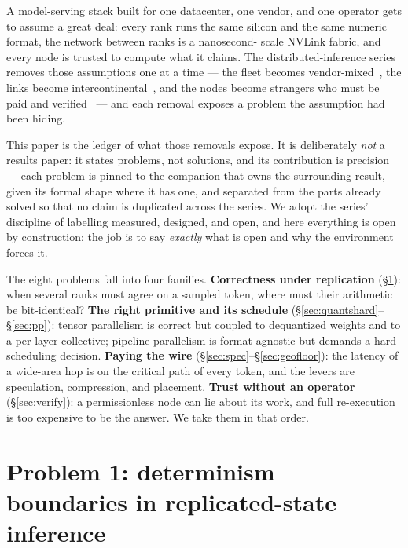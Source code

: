 \documentclass[11pt]{article}
\begin{document}
A model-serving stack built for one datacenter, one vendor, and one operator gets to assume a great deal:
every rank runs the same silicon and the same numeric format, the network between ranks is a nanosecond-
scale NVLink fabric, and every node is trusted to compute what it claims. The distributed-inference series
removes those assumptions one at a time --- the fleet becomes vendor-mixed~\cite{het}, the links become
intercontinental~\cite{latency}, and the nodes become strangers who must be paid and
verified~\cite{consensus} --- and each removal exposes a problem the assumption had been hiding.

This paper is the ledger of what those removals expose. It is deliberately \emph{not} a results paper: it
states problems, not solutions, and its contribution is precision --- each problem is pinned to the
companion that owns the surrounding result, given its formal shape where it has one, and separated from
the parts already solved so that no claim is duplicated across the series. We adopt the series' discipline
of labelling measured, designed, and open, and here everything is open by construction; the job is to say
\emph{exactly} what is open and why the environment forces it.

The eight problems fall into four families. \textbf{Correctness under replication} (\S\ref{sec:determinism}):
when several ranks must agree on a sampled token, where must their arithmetic be bit-identical?
\textbf{The right primitive and its schedule} (\S\ref{sec:quantshard}--\S\ref{sec:pp}): tensor parallelism
is correct but coupled to dequantized weights and to a per-layer collective; pipeline parallelism is
format-agnostic but demands a hard scheduling decision. \textbf{Paying the wire} (\S\ref{sec:spec}--\S\ref{sec:geofloor}):
the latency of a wide-area hop is on the critical path of every token, and the levers are speculation,
compression, and placement. \textbf{Trust without an operator} (\S\ref{sec:verify}): a permissionless node
can lie about its work, and full re-execution is too expensive to be the answer. We take them in that
order.

\section{Problem 1: determinism boundaries in replicated-state inference}
\label{sec:determinism}
\end{document}
